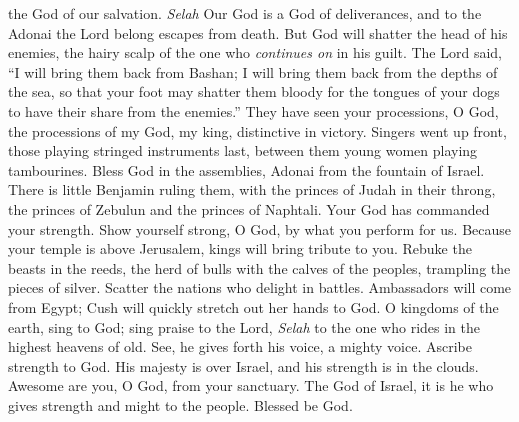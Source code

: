 \begin{biblechapter}
the God of our salvation. \textit{Selah}
\verse Our God is a God of deliverances, 
and to the Adonai the Lord belong escapes from death.
\verse But God will shatter the head of his enemies, 
the hairy scalp of the one who \textit{continues on} in his guilt.
\verse The Lord said, “I will bring them back from Bashan; 
I will bring them back from the depths of the sea,
\verse so that your foot may shatter them bloody 
for the tongues of your dogs to have their share from the enemies.”
\verse They have seen your processions, O God, 
the processions of my God, my king, distinctive in victory.
\verse Singers went up front, those playing stringed instruments last, 
between them young women playing tambourines.
\verse Bless God in the assemblies, 
Adonai from the fountain of Israel.
\verse There is little Benjamin ruling them, 
with the princes of Judah in their throng, 
the princes of Zebulun and the princes of Naphtali.
\verse Your God has commanded your strength. 
Show yourself strong, O God, by what you perform for us.
\verse Because your temple is above Jerusalem, 
kings will bring tribute to you.
\verse Rebuke the beasts in the reeds, 
the herd of bulls with the calves of the peoples, 
trampling the pieces of silver. 
Scatter the nations who delight in battles.
\verse Ambassadors will come from Egypt; 
Cush will quickly stretch out her hands to God.
\verse O kingdoms of the earth, sing to God; 
sing praise to the Lord, \textit{Selah}
\verse to the one who rides in the highest heavens of old. 
See, he gives forth his voice, a mighty voice.
\verse Ascribe strength to God. 
His majesty is over Israel, 
and his strength is in the clouds.
\verse Awesome are you, O God, from your sanctuary. 
The God of Israel, it is he who gives strength and might to the people. 
Blessed be God.
\end{biblechapter}

